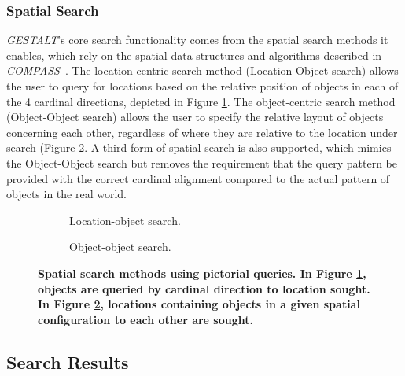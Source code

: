 \subsubsection{\textbf{Spatial Search}}
\emph{GESTALT}'s core search functionality comes from the spatial search methods it enables, which rely on the spatial data structures and algorithms described in \emph{COMPASS}~\cite{Osul2023}.
The location-centric search method (Location-Object search) allows the user to query for locations based on the relative position of objects in each of the 4 cardinal directions, depicted in Figure \ref{fig:spatial_search_loc}.
The object-centric search method (Object-Object search) allows the user to specify the relative layout of objects concerning each other, regardless of where they are relative to the location under search (Figure \ref{fig:spatial_search_obj}.
A third form of spatial search is also supported, which mimics the Object-Object search but removes the requirement that the query pattern be provided with the correct cardinal alignment compared to the actual pattern of objects in the real world.


\begin{figure}[h]
    \centering
    \begin{subfigure}[t]{.2\textwidth}
        
        \caption{\small Location-object search.} 
        \label{fig:spatial_search_loc}
    \end{subfigure}
    \hfill
    \begin{subfigure}[t]{.2\textwidth}
        
        \caption{\small Object-object search.} 
        \label{fig:spatial_search_obj}
    \end{subfigure}
    \hfill
    \caption{\textbf{Spatial search methods using pictorial queries. In Figure \ref{fig:spatial_search_loc}, objects are queried by cardinal direction to location sought. In Figure \ref{fig:spatial_search_obj}, locations containing objects in a given spatial configuration to each other are sought.}}\label{figure:spatial_search} 
\end{figure}



\subsection{Search Results}

